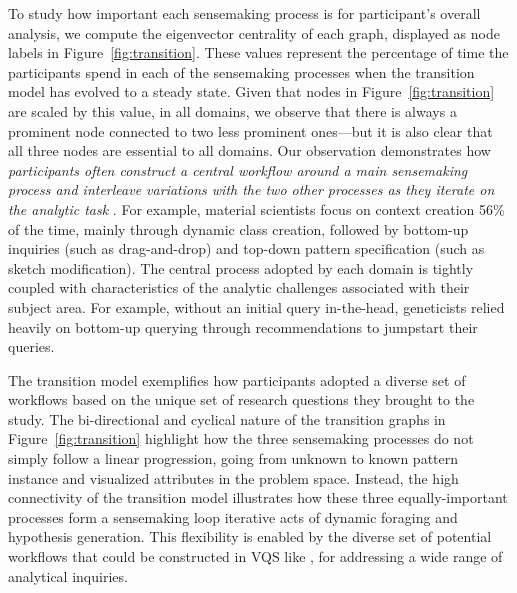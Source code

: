 \par To study how important each sensemaking process
is for participant's overall analysis,
we compute the eigenvector centrality of each graph,
displayed as node labels in Figure~\ref{fig:transition}.
These values represent the percentage of time the participants
spend in each of the sensemaking processes
when the transition model has evolved to a steady state.
Given that nodes in Figure~\ref{fig:transition}
are scaled by this value, in all domains,
we observe that there is always a prominent node
connected to two less prominent ones---but it is also clear
that all three nodes are essential to all domains.
Our observation demonstrates how \emph{participants
often construct a central workflow
around a main sensemaking process
and interleave variations with the two other processes
as they iterate on the analytic task}
.
For example, material scientists focus
on context creation 56\% of the time,
mainly through dynamic class creation,
followed by bottom-up inquiries (such as drag-and-drop)
 and top-down pattern specification (such as sketch modification).
The central process adopted by each domain
is tightly coupled with characteristics
of the analytic challenges associated with their subject area.
For example, without an initial query in-the-head,
geneticists relied heavily on bottom-up querying
through recommendations to jumpstart their queries.
\par The  transition model exemplifies how participants
adopted a diverse set of workflows
based on the unique set of research questions they brought to the study.
The bi-directional and cyclical nature
of the transition graphs in Figure~\ref{fig:transition} highlight how the three sensemaking processes do not simply follow a linear progression, going from unknown to known pattern instance and visualized attributes in the problem space. Instead, the high connectivity of the transition model illustrates how these three equally-important processes form a sensemaking loop iterative acts of dynamic foraging and hypothesis generation. This flexibility is enabled by the diverse set of potential workflows that could be constructed in  VQS like \zvpp, for addressing a wide range of analytical inquiries.%
